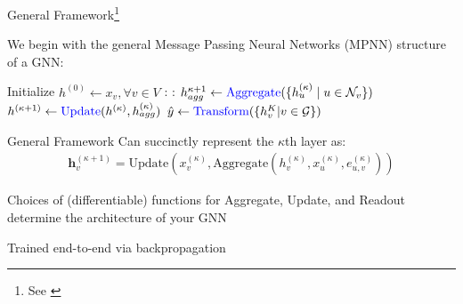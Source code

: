 \documentclass{beamer}
\newcommand{\nhood}{\mathcal{N}}
\newcommand{\Graph}{\mathcal{G}}
\newcommand{\NodeSet}{V}
\newcommand{\node}{v}
\newcommand{\nrepresent}{h}
\newcommand{\edge}{e}
\newcommand{\iter}{\kappa}
\newcommand{\Iter}{K}
\begin{document}
\begin{frame}{
    General Framework\footnote{See \cite{ektefaie_multimodal_2023,gilmer_neural_2017, xu_how_2019}}
    }

    We begin with the general Message Passing Neural Networks (MPNN) structure of a GNN: 

    \vspace{4mm}
    
    \begin{algorithmic}[1]
    \State Initialize $\nrepresent^{(0)} \gets x_\node, \forall \node \in \NodeSet$ 
        \For{$\iter = 0, ..., \Iter$}:
            \For{$\node \in \Graph$}:
            \State $\nrepresent_{agg}^{\iter+1} \gets \text{\textcolor{blue}{Aggregate}}(\{h_u^{(\iter)} \mid u \in \nhood_\node\})$ 
            \State $\nrepresent^{(\iter+1)} \gets \text{\textcolor{blue}{Update}}(\nrepresent^{(\iter)}, \nrepresent_{agg}^{(\iter)})$
            \EndFor
        \EndFor
        \State $\hat{y} \gets \text{\textcolor{blue}{Transform}}(\{h^\Iter_\node | \node \in \Graph\})$ 
    \end{algorithmic}   

\end{frame}




\begin{frame}{General Framework}
Can succinctly represent the $\iter$th layer as: 
\begin{gather*}
    \mathbf{h}_\node^{(\iter+1)} 
    =
    \text{Update}
    \left( 
    x_\node^{(\iter)}
    ,   
    \text{Aggregate}
    (
        h_\node^{(\iter)}, x_u^{(\iter)}, \edge_{u,\node}^{(\iter)}
    )
    \right)
\end{gather*}

Choices of (differentiable) functions for Aggregate, Update, and Readout determine the architecture of your GNN 

\vspace{4mm}

Trained end-to-end via backpropagation

\end{frame}
\end{document}
